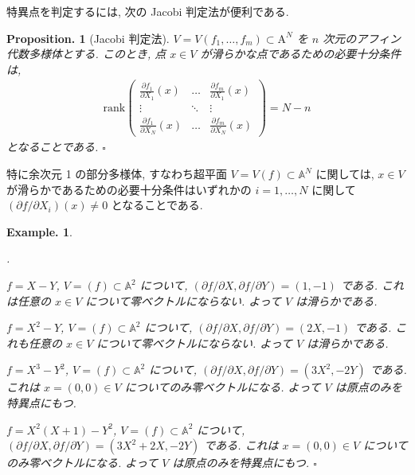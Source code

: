 \documentclass[openany, a4paper, oneside]{jsbook}
\newcounter{enum2}
\renewenvironment{enumerate}{%
\begin{list}%
{%
\arabic{enum2}.\ \,%
}%
{%
\usecounter{enum2}
\setlength{\itemindent}{0pt}%
\setlength{\leftmargin}{15pt}%
\setlength{\rightmargin}{0pt}%
\setlength{\labelsep}{0pt}%
\setlength{\labelwidth}{6pt}%
\setlength{\itemsep}{0pt}%
\setlength{\parsep}{0pt}%
\setlength{\listparindent}{0pt}%
}
}{%
\end{list}%
}
\theoremstyle{break}
\newtheorem{prop}[thm]{Proposition.}
\theoremstyle{breakdefn}
\newtheorem{ex}[thm]{Example.}
\newcommand{\fin}{\hfill $\square$ \par}
\begin{document}
特異点を判定するには, 次の Jacobi 判定法が便利である.
\begin{prop}[Jacobi 判定法]
 $V = V (f_1,\dots,f_m) \subset \mathrm{A}^N$ を $n$ 次元のアフィン代数多様体とする.
 このとき, 点 $x \in V$ が滑らかな点であるための必要十分条件は,
 \begin{align}
  \mathrm{rank} \left(
  \begin{array}{ccc}
   \frac{\partial f_1}{\partial X_1}(x) & \ldots &  \frac{\partial f_m}{\partial X_1}(x) \\
   \vdots & \ddots & \vdots \\
   \frac{\partial f_1}{\partial X_N}(x) & \ldots & \frac{\partial f_m}{\partial X_N}(x)
  \end{array}
  \right)
  =
  N -n
 \end{align}
 となることである. \fin
\end{prop}

特に余次元 1 の部分多様体, すなわち超平面 $V=V (f) \subset \mathbb{A}^N$ に関しては,
$x \in V$ が滑らかであるための必要十分条件はいずれかの $i=1, \dots, N$ に関して $(\partial f / \partial X_i) (x) \neq 0$ となることである.
\begin{ex}
\begin{enumerate}
\item $f=X-Y$, $V=(f) \subset \mathbb{A}^2$ について,
   $(\partial f/\partial X, \partial f/\partial Y) = (1, -1)$ である.
   これは任意の $x \in V$ について零ベクトルにならない.
   よって $V$ は滑らかである.
\item $f=X^2-Y$, $V=(f) \subset \mathbb{A}^2$ について, $(\partial f/\partial X, \partial f/\partial Y) = (2X , -1)$ である.
   これも任意の $x \in V$ について零ベクトルにならない.
   よって $V$ は滑らかである.
\item $f=X^3-Y^2$, $V=(f) \subset \mathbb{A}^2$ について,
   $(\partial f/\partial X, \partial f/\partial Y) = (3X^2 , -2Y)$ である.
   これは $x = (0,0)  \in V$ についてのみ零ベクトルになる.
   よって $V$ は原点のみを特異点にもつ.
\item $f=X^2 (X+1)-Y^2$, $V=(f) \subset \mathbb{A}^2$ について,
   $(\partial f / \partial X, \partial f/\partial Y) = (3X^2+2X , -2Y)$ である.
   これは $x = (0,0) \in V$ についてのみ零ベクトルになる.
   よって $V$ は原点のみを特異点にもつ. \fin
\end{enumerate}
\end{ex}
\end{document}
